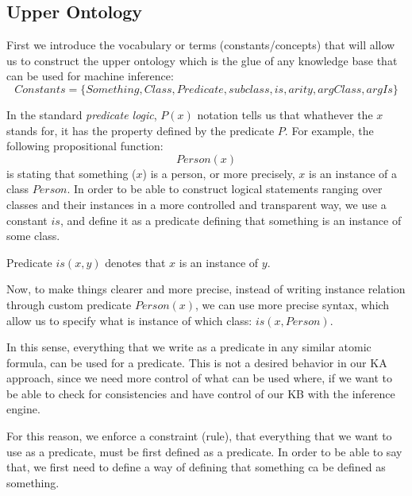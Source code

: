 \subsection{Upper Ontology}
\label{section:upperOnto}
First we introduce the vocabulary or terms (constants/concepts) that will allow 
us to construct the upper ontology which is the glue of any knowledge base that 
can be used for machine inference:
\begin{equation}
Constants = \{Something, Class, Predicate, subclass, is, arity, argClass, argIs\}
\end{equation}

In the standard \emph{predicate logic}, $P(x)$ notation tells us that whathever 
the $x$ stands for, it has the property defined by the predicate $P$. 
For example, the following propositional function:
\begin{equation}
Person(x)
\end{equation}
is stating that something ($x$) is a person, or more precisely, $x$ is an instance
of a class $Person$. In order to be able to construct logical statements ranging
over classes and their instances in a more controlled and transparent way, we
use a constant $is$, and define it as a predicate defining that something is an
instance of some class.
\begin{definition}[predicate "$is$"]
\label{const:is}
Predicate $is(x,y)$ denotes that $x$ is an instance of $y$.
\end{definition}
Now, to make things clearer and more precise, instead of writing instance
relation through custom predicate $Person(x)$, we can use more precise syntax, 
which allow us to specify what is instance of which class: $is(x,Person)$.

In this sense, everything that we write as a predicate in any similar 
atomic formula, can be
used for a predicate. This is not a desired behavior in our KA approach, since
we need more control of what can be used where, if we want to be able to
check for consistencies and have control of our KB with the inference engine.

For this reason, we enforce a constraint (rule), that everything that we want 
to use as a predicate, must be first defined as a predicate. In order  to be
able to say that, we first need to define a way of defining that something ca
be defined as something.
